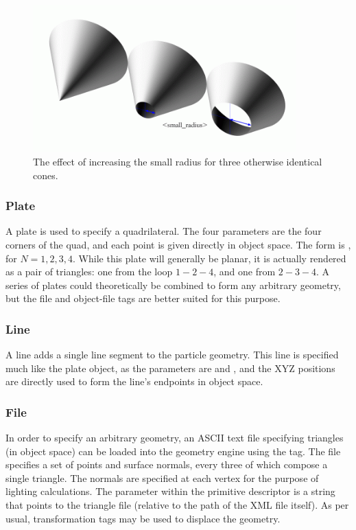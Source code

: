 \begin{figure}[htb]
 \begin{center}
   \includegraphics[width=4in]{pics/conesmall.png}
 \end{center}
        \caption[The effect of increasing the small radius on cones]{The effect of increasing the small radius for three otherwise identical cones.}
        \label{fig:ConeSmall}
\end{figure}

\subsubsection{Plate}
A plate is used to specify a quadrilateral.  The four parameters are the four corners of the quad, and each point is given directly in object space.  The form is , for $N = 1, 2, 3, 4$.  While this plate will generally be planar, it is actually rendered as a pair of triangles: one from the loop $1-2-4$, and one from $2-3-4$.  A series of plates could theoretically be combined to form any arbitrary geometry, but the file and object-file tags are better suited for this purpose.

\subsubsection{Line}
A line adds a single line segment to the particle geometry.  This line is specified much like the plate object, as the parameters are  and , and the XYZ positions are directly used to form the line's endpoints in object space.

\subsubsection{File}
In order to specify an arbitrary geometry, an ASCII text file specifying triangles (in object space) can be loaded into the geometry engine using the  tag.  The file specifies a set of points and surface normals, every three of which compose a single triangle.  The normals are specified at each vertex for the purpose of lighting calculations.  The  parameter within the primitive descriptor is a string that points to the triangle file (relative to the path of the XML file itself).  As per usual, transformation tags may be used to displace the geometry.

